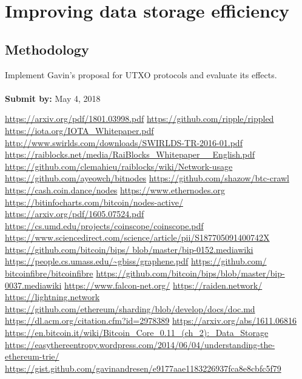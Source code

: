 \documentclass{article}
\begin{document}
\section{Improving data storage efficiency}
\subsection* {Methodology}
Implement Gavin's proposal \cite{cuckoo} for UTXO protocols and evaluate its effects.
\\
\\
\textbf{Submit by: } May 4, 2018

\begin{thebibliography}{92}
\url{https://arxiv.org/pdf/1801.03998.pdf}
\url{https://github.com/ripple/rippled}
\url{https://iota.org/IOTA\_Whitepaper.pdf}
\url{http://www.swirlds.com/downloads/SWIRLDS-TR-2016-01.pdf}
\url{https://raiblocks.net/media/RaiBlocks\_Whitepaper\_\_English.pdf}
\url{https://github.com/clemahieu/raiblocks/wiki/Network-usage}
\url{https://github.com/ayeowch/bitnodes}
\url{https://github.com/shazow/btc-crawl}
\url{https://cash.coin.dance/nodes}
\url{https://www.ethernodes.org}
\url{https://bitinfocharts.com/bitcoin/nodes-active/}
\url{https://arxiv.org/pdf/1605.07524.pdf}
\url{https://cs.umd.edu/projects/coinscope/coinscope.pdf}
\url{https://www.sciencedirect.com/science/article/pii/S187705091400742X}
\url{https://github.com/bitcoin/bips/
blob/master/bip-0152.mediawiki}
\url{https://people.cs.umass.edu/~gbiss/graphene.pdf}
\url{https://github.com/
bitcoinfibre/bitcoinfibre}
\url{https://github.com/bitcoin/bips/blob/master/bip-0037.mediawiki}
\url{https://www.falcon-net.org/}
\url{https://raiden.network/}
\url{https://lightning.network}
\url{https://github.com/ethereum/sharding/blob/develop/docs/doc.md}
\url{https://dl.acm.org/citation.cfm?id=2978389}
\url{https://arxiv.org/abs/1611.06816}
\url{https://en.bitcoin.it/wiki/Bitcoin_Core_0.11_(ch_2):_Data_Storage}
\url{https://easythereentropy.wordpress.com/2014/06/04/understanding-the-ethereum-trie/}
\url{https://gist.github.com/gavinandresen/e9177aae1183226937fca8e8cbfc5f79}
\end{thebibliography}
\end{document}
